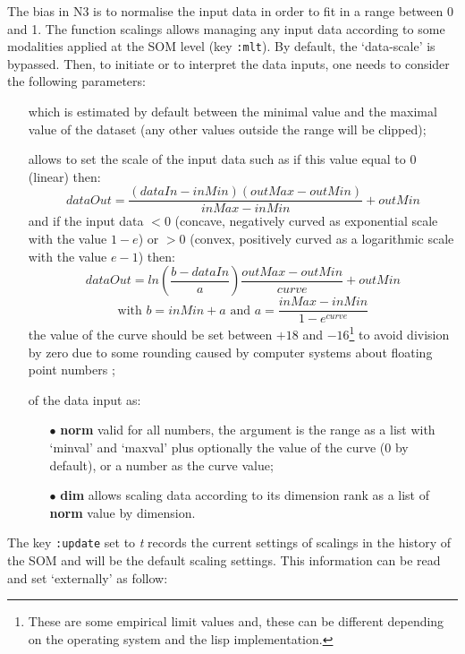 \bigskip
\bigskip

\label{pt:as}

\bigskip

The bias in N3 is to normalise the input data in order to fit in a range between 0 and 1. The function \glspl{scaling} allows managing any input data according to some modalities applied at the SOM level (key \texttt{:mlt}). By default, the `data-scale' is bypassed. Then, to initiate or to interpret the data inputs, one needs to consider the following parameters:
\begin{itemize}
\item[]  which is estimated by default between the minimal value and the maximal value of the dataset (any other values outside the range will be clipped);

\item[]  allows to set the scale of the input data such as if this value equal to 0 (linear) then: 
$$dataOut=\frac{(dataIn-inMin)(outMax-outMin)}{inMax-inMin}+outMin$$
and if the input data $< 0$ (concave, negatively curved as exponential scale with the value $1-e$) or $> 0$ (convex, positively curved as a logarithmic scale with the value $e-1$) then:
$$dataOut=ln\left(\dfrac{b-dataIn}{a}\right)\dfrac{outMax-outMin}{curve}+outMin$$
$$\text{with } b=inMin+a \text{ and }  a=\dfrac{inMax-inMin}{1-e^{curve}}$$ the value of the curve should be set between $+18$ and $-16$\footnote{These are some empirical limit values and, these can be different depending on the operating system and the lisp implementation.} to avoid division by zero due to some rounding caused by computer systems about floating point numbers \citep{re};
\item[]  of the data input as:
\begin{itemize}
\item[$\bullet$] \textbf{norm} valid for all numbers, the argument is the range as a list with `minval' and `maxval' plus optionally the value of the curve (0 by default), or a number as the curve value; %
\item[$\bullet$] \textbf{dim} allows scaling data according to its dimension rank as a list of \textbf{norm} value by dimension.
\end{itemize}
\end{itemize}
The key \texttt{:update} set to \textit{t} records the current settings of \glspl{scaling} in the history of the SOM and will be the default scaling settings. This information can be read and set `externally'  as follow:

